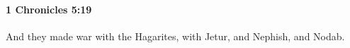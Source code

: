 
		\paragraph{1 Chronicles 5:19} %
			\label{1CHRONICLES-5-19}

			And they made war with the Hagarites, with Jetur, and Nephish, and Nodab.



